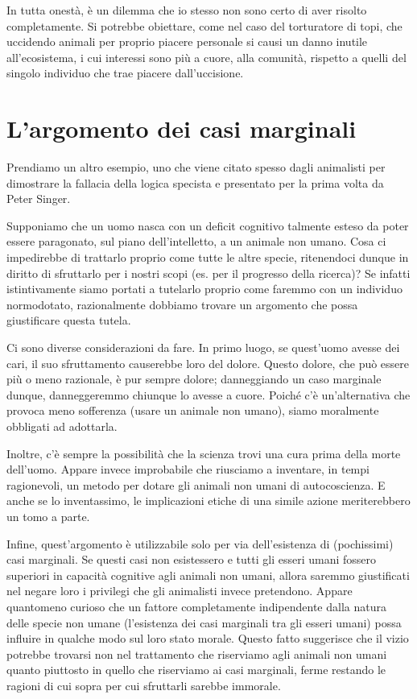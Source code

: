 \documentclass[a4paper,11pt,oneside,article]{memoir}
\begin{document}
In tutta onestà, è un dilemma che io stesso non sono certo di aver risolto
completamente. Si potrebbe obiettare, come nel caso del torturatore di topi, che
uccidendo animali per proprio piacere personale si causi un danno inutile
all'ecosistema, i cui interessi sono più a cuore, alla comunità, rispetto a
quelli del singolo individuo che trae piacere dall'uccisione.

\section{L'argomento dei casi marginali}

Prendiamo un altro esempio, uno che viene citato spesso dagli animalisti per
dimostrare la fallacia della logica specista e presentato per la prima volta da
Peter Singer\footnotemark[2].

Supponiamo che un uomo nasca con un deficit cognitivo talmente esteso da poter
essere paragonato, sul piano dell'intelletto, a un animale non umano. Cosa ci
impedirebbe di trattarlo proprio come tutte le altre specie, ritenendoci dunque
in diritto di sfruttarlo per i nostri scopi (es. per il progresso della
ricerca)? Se infatti istintivamente siamo portati a tutelarlo proprio come
faremmo con un individuo normodotato, razionalmente dobbiamo trovare un
argomento che possa giustificare questa tutela.

Ci sono diverse considerazioni da fare. In primo luogo, se quest'uomo avesse dei
cari, il suo sfruttamento causerebbe loro del dolore. Questo dolore, che può
essere più o meno razionale, è pur sempre dolore; danneggiando un caso marginale
dunque, danneggeremmo chiunque lo avesse a cuore. Poiché c'è un'alternativa che
provoca meno sofferenza (usare un animale non umano), siamo moralmente obbligati
ad adottarla.

Inoltre, c'è sempre la possibilità che la scienza trovi una cura prima della
morte dell'uomo. Appare invece improbabile che riusciamo a inventare, in tempi
ragionevoli, un metodo per dotare gli animali non umani di autocoscienza. E
anche se lo inventassimo, le implicazioni etiche di una simile azione
meriterebbero un tomo a parte.

Infine, quest'argomento è utilizzabile solo per via dell'esistenza di
(pochissimi) casi marginali. Se questi casi non esistessero e tutti gli esseri
umani fossero superiori in capacità cognitive agli animali non umani, allora
saremmo giustificati nel negare loro i privilegi che gli animalisti invece
pretendono. Appare quantomeno curioso che un fattore completamente indipendente
dalla natura delle specie non umane (l'esistenza dei casi marginali tra gli
esseri umani) possa influire in qualche modo sul loro stato morale. Questo fatto
suggerisce che il vizio potrebbe trovarsi non nel trattamento che riserviamo
agli animali non umani quanto piuttosto in quello che riserviamo ai casi
marginali, ferme restando le ragioni di cui sopra per cui sfruttarli sarebbe
immorale.
\end{document}
